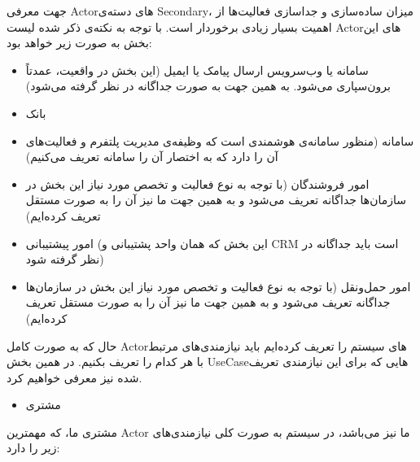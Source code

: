 \documentclass[]{article}
\begin{document}
جهت معرفی Actorهای دسته‌ی Secondary، میزان ساده‌سازی و جداسازی فعالیت‌ها
از اهمیت بسیار زیادی برخوردار است. با توجه به نکته‌ی ذکر شده لیست
Actorهای این بخش به صورت زیر خواهد بود:

\begin{itemize}
\item
  سامانه یا وب‌سرویس ارسال پیامک یا ایمیل (این بخش در واقعیت، عمدتاً
  برون‌سپاری می‌شود. به همین جهت به صورت جداگانه در نظر گرفته می‌شود)
\item
  بانک
\item
  سامانه (منظور سامانه‌ی هوشمندی است که وظیفه‌ی مدیریت پلتفرم و
  فعالیت‌های آن را دارد که به اختصار آن را سامانه تعریف می‌کنیم)
\item
  امور فروشندگان (با توجه به نوع فعالیت و تخصص مورد نیاز این بخش در
  سازمان‌ها جداگانه تعریف می‌شود و به همین جهت ما نیز آن را به صورت
  مستقل تعریف کرده‌ایم)
\item
  امور پیشتیبانی (این بخش که همان واحد پشتیبانی و CRM است باید جداگانه
  در نظر گرفته شود)
\item
  امور حمل‌ونقل (با توجه به نوع فعالیت و تخصص مورد نیاز این بخش در
  سازمان‌ها جداگانه تعریف می‌شود و به همین جهت ما نیز آن را به صورت
  مستقل تعریف کرده‌ایم)
\end{itemize}

حال که به صورت کامل Actorهای سیستم را تعریف کرده‌ایم باید نیازمندی‌های
مرتبط با هر کدام را تعریف بکنیم. در همین بخش UseCaseهایی که برای این
نیازمندی تعریف شده نیز معرفی خواهیم کرد.

\begin{itemize}
\item
  مشتری
\end{itemize}

مشتری ما، که مهمترین Actor ما نیز می‌باشد، در سیستم به صورت کلی
نیازمندی‌های زیر را دارد:
\end{document}
